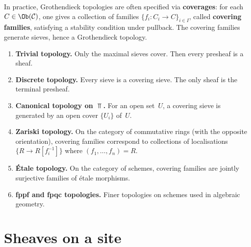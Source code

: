 \begin{definition}[Coverage]\label{def:coverage}
In practice, Grothendieck topologies are often specified via
\textbf{coverages}: for each $C\in\Ob(\mathcal{C})$, one gives a
collection of families $\{f_i\colon C_i\to C\}_{i\in I}$, called
\textbf{covering families}, satisfying a stability condition under
pullback.  The covering families generate sieves, hence a Grothendieck
topology.
\end{definition}

\begin{example}\label{ex:topologies}
\begin{enumerate}[label=(\roman*)]
\item \textbf{Trivial topology.}
      Only the maximal sieves cover.  Then every presheaf is a sheaf.
\item \textbf{Discrete topology.}
      Every sieve is a covering sieve.  The only sheaf is the terminal
      presheaf.
\item \textbf{Canonical topology on $\Top$.}
      For an open set~$U$, a covering sieve is generated by an
      open cover $\{U_i\}$ of~$U$.
\item \textbf{Zariski topology.}
      On the category of commutative rings (with the opposite orientation),
      covering families correspond to collections of localisations
      $\{R\to R[f_i^{-1}]\}$ where $(f_1,\ldots,f_n) = R$.
\item \textbf{\'Etale topology.}
      On the category of schemes, covering families are jointly surjective
      families of \'etale morphisms.
\item \textbf{fppf and fpqc topologies.}
      Finer topologies on schemes used in algebraic geometry.
\end{enumerate}
\end{example}



\section{Sheaves on a site}\label{sec:sheaves-site}

